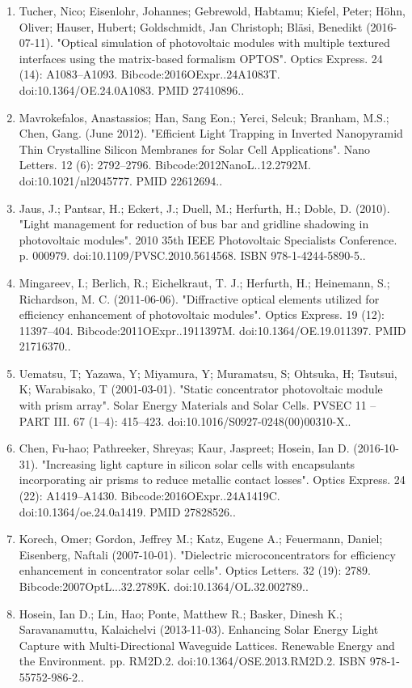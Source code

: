 \begin{enumerate}
\item Tucher, Nico; Eisenlohr, Johannes; Gebrewold, Habtamu; Kiefel, Peter; Höhn, Oliver; Hauser, Hubert; Goldschmidt, Jan Christoph; Bläsi, Benedikt (2016-07-11). "Optical simulation of photovoltaic modules with multiple textured interfaces using the matrix-based formalism OPTOS". Optics Express. 24 (14): A1083–A1093. Bibcode:2016OExpr..24A1083T. doi:10.1364/OE.24.0A1083. PMID 27410896..
\item Mavrokefalos, Anastassios; Han, Sang Eon.; Yerci, Selcuk; Branham, M.S.; Chen, Gang. (June 2012). "Efficient Light Trapping in Inverted Nanopyramid Thin Crystalline Silicon Membranes for Solar Cell Applications". Nano Letters. 12 (6): 2792–2796. Bibcode:2012NanoL..12.2792M. doi:10.1021/nl2045777. PMID 22612694..
\item Jaus, J.; Pantsar, H.; Eckert, J.; Duell, M.; Herfurth, H.; Doble, D. (2010). "Light management for reduction of bus bar and gridline shadowing in photovoltaic modules". 2010 35th IEEE Photovoltaic Specialists Conference. p. 000979. doi:10.1109/PVSC.2010.5614568. ISBN 978-1-4244-5890-5..
\item Mingareev, I.; Berlich, R.; Eichelkraut, T. J.; Herfurth, H.; Heinemann, S.; Richardson, M. C. (2011-06-06). "Diffractive optical elements utilized for efficiency enhancement of photovoltaic modules". Optics Express. 19 (12): 11397–404. Bibcode:2011OExpr..1911397M. doi:10.1364/OE.19.011397. PMID 21716370..
\item Uematsu, T; Yazawa, Y; Miyamura, Y; Muramatsu, S; Ohtsuka, H; Tsutsui, K; Warabisako, T (2001-03-01). "Static concentrator photovoltaic module with prism array". Solar Energy Materials and Solar Cells. PVSEC 11 – PART III. 67 (1–4): 415–423. doi:10.1016/S0927-0248(00)00310-X..
\item Chen, Fu-hao; Pathreeker, Shreyas; Kaur, Jaspreet; Hosein, Ian D. (2016-10-31). "Increasing light capture in silicon solar cells with encapsulants incorporating air prisms to reduce metallic contact losses". Optics Express. 24 (22): A1419–A1430. Bibcode:2016OExpr..24A1419C. doi:10.1364/oe.24.0a1419. PMID 27828526..
\item Korech, Omer; Gordon, Jeffrey M.; Katz, Eugene A.; Feuermann, Daniel; Eisenberg, Naftali (2007-10-01). "Dielectric microconcentrators for efficiency enhancement in concentrator solar cells". Optics Letters. 32 (19): 2789. Bibcode:2007OptL...32.2789K. doi:10.1364/OL.32.002789..
\item Hosein, Ian D.; Lin, Hao; Ponte, Matthew R.; Basker, Dinesh K.; Saravanamuttu, Kalaichelvi (2013-11-03). Enhancing Solar Energy Light Capture with Multi-Directional Waveguide Lattices. Renewable Energy and the Environment. pp. RM2D.2. doi:10.1364/OSE.2013.RM2D.2. ISBN 978-1-55752-986-2..

\end{enumerate}
